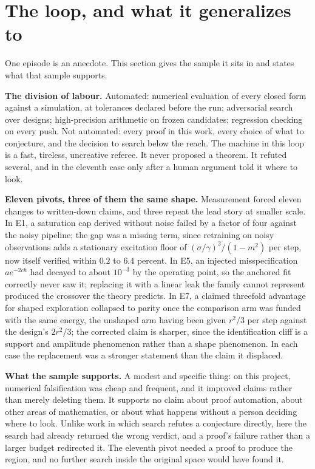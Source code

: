 \documentclass{article}
\begin{document}
\section{The loop, and what it generalizes to}
\label{sec:loop}

One episode is an anecdote. This section gives the sample it sits in and
states what that sample supports.

\textbf{The division of labour.} Automated: numerical evaluation of every
closed form against a simulation, at tolerances declared before the run;
adversarial search over designs; high-precision arithmetic on frozen
candidates; regression checking on every push. Not automated: every proof in
this work, every choice of what to conjecture, and the decision to search
below the reach. The machine in this loop is a fast, tireless, uncreative
referee. It never proposed a theorem. It refuted several, and in the eleventh
case only after a human argument told it where to look.

\textbf{Eleven pivots, three of them the same shape.} Measurement forced
eleven changes to written-down claims, and three repeat the lead story at
smaller scale. In E1, a saturation cap derived without noise failed by a
factor of four against the noisy pipeline; the gap was a missing term, since
retraining on noisy observations adds a stationary excitation floor of
$(\sigma/\gamma)^2/(1-m^2)$ per step, now itself verified within $0.2$ to
$6.4$ percent. In E5, an injected misspecification $a e^{-2ch}$ had decayed
to about $10^{-3}$ by the operating point, so the anchored fit correctly
never saw it; replacing it with a linear leak the family cannot represent
produced the crossover the theory predicts. In E7, a claimed threefold
advantage for shaped exploration collapsed to parity once the comparison arm
was funded with the same energy, the unshaped arm having been given $r^2/3$
per step against the design's $2r^2/3$; the corrected claim is sharper, since
the identification cliff is a support and amplitude phenomenon rather than a
shape phenomenon. In each case the replacement was a stronger statement than
the claim it displaced.

\textbf{What the sample supports.} A modest and specific thing: on this
project, numerical falsification was cheap and frequent, and it improved
claims rather than merely deleting them. It supports no claim about proof
automation, about other areas of mathematics, or about what happens without a
person deciding where to look. Unlike work in which search refutes a
conjecture directly, here the search had already returned the wrong verdict,
and a proof's failure rather than a larger budget redirected it. The eleventh
pivot needed a proof to produce the region, and no further search inside the
original space would have found it.
\end{document}
